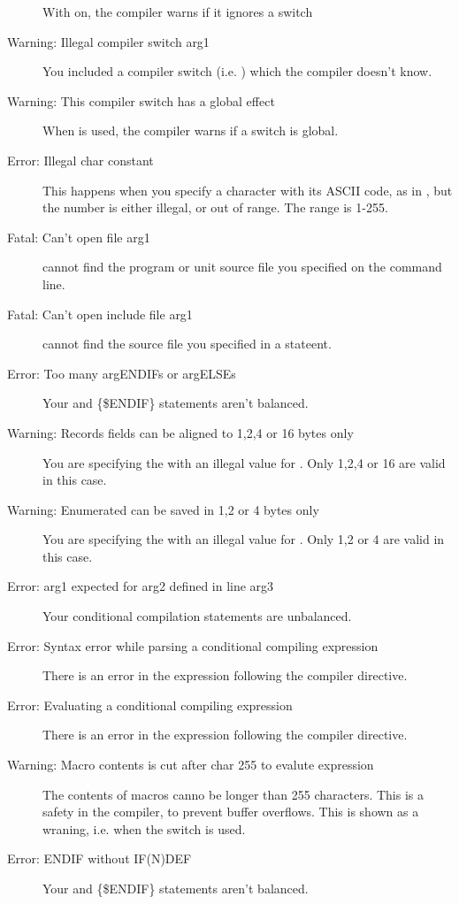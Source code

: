 \begin{description}
 With  on, the compiler warns if it ignores a switch
\item [Warning: Illegal compiler switch arg1]
 You included a compiler switch (i.e. ) which the compiler
 doesn't know.
\item [Warning: This compiler switch has a global effect]
 When  is used, the compiler warns if a switch is global.
\item [Error: Illegal char constant]
 This happens when you specify a character with its ASCII code, as in
 , but the number is either illegal, or out of range. The range
 is 1-255.
\item [Fatal: Can't open file arg1]
 \fpc cannot find the program or unit source file you specified on the
 command line.
\item [Fatal: Can't open include file arg1]
 \fpc cannot find the source file you specified in a 
 stateent.
\item [Error: Too many argENDIFs or argELSEs]
 Your  and {\{\$ENDIF\}} statements aren't balanced.
\item [Warning: Records fields can be aligned to 1,2,4 or 16 bytes only]
 You are specifying the  with an illegal value for
 . Only 1,2,4 or 16 are valid in this case.
\item [Warning: Enumerated can be saved in 1,2 or 4 bytes only]
 You are specifying the  with an illegal value for
 . Only 1,2 or 4 are valid in this case.
\item [Error: arg1 expected for arg2 defined in line arg3]
 Your conditional compilation statements are unbalanced.
\item [Error: Syntax error while parsing a conditional compiling expression]
 There is an error in the expression following the  compiler
 directive.
\item [Error: Evaluating a conditional compiling expression]
 There is an error in the expression following the  compiler
 directive.
\item [Warning: Macro contents is cut after char 255 to evalute expression]
 The contents of macros canno be longer than 255 characters. This is a
 safety in the compiler, to prevent buffer overflows. This is shown as a 
 wraning, i.e. when the  switch is used.
\item [Error: ENDIF without IF(N)DEF]
 Your  and {\{\$ENDIF\}} statements aren't balanced.

\end{description}
